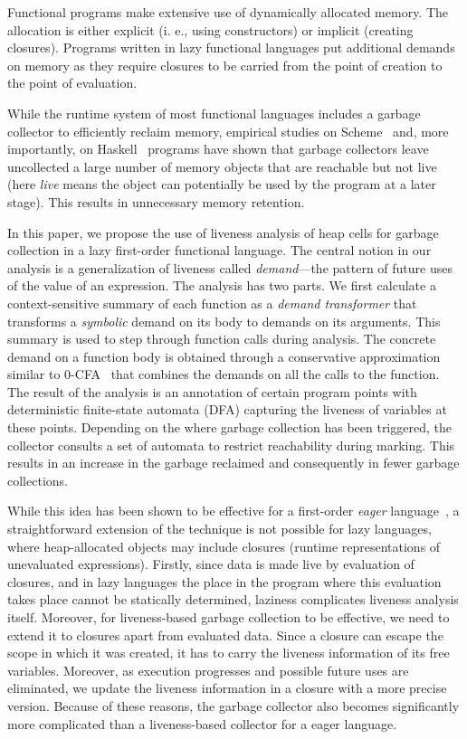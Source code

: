 \documentclass[preprint, 9pt]{sigplanconf}
\begin{document}
Functional programs make extensive use of dynamically allocated
memory.  The
allocation  is either  explicit (i. e., using  constructors) or
implicit (creating  closures).  Programs  written in  lazy
functional languages put additional  demands on memory as they require
closures to  be carried  from the  point of creation  to the  point of
evaluation.

While  the runtime  system  of most  functional  languages includes  a
garbage collector to efficiently  reclaim memory, empirical studies on
Scheme~\cite{karkare06effectiveness}   and,   more   importantly,   on
Haskell~\cite{rojemo96lag} programs have shown that garbage collectors
leave uncollected a large number  of memory objects that are reachable
but not live (here {\em live} means the object can potentially be used
by the program at a  later stage).  This results in unnecessary memory
retention.

In this paper,  we propose the use of liveness  analysis of heap cells
for garbage collection in a lazy first-order functional language.  The
central notion in our analysis  is a generalization of liveness called
{\em  demand}---the  pattern  of  future  uses  of  the  value  of  an
expression.   The  analysis  has  two parts.   We  first  calculate  a
context-sensitive  summary   of  each   function  as  a   {\em  demand
  transformer} that transforms a {\em  symbolic} demand on its body to
demands  on its  arguments.   This  summary is  used  to step  through
function  calls  during analysis.   The  concrete demand  on  a
function body is obtained through a conservative approximation similar
to  0-CFA~\cite{Shivers:1988} that  combines  the demands  on all  the
calls to the function.  The result of the analysis is an annotation of
certain program points with  deterministic finite-state automata (DFA)
capturing the liveness of variables at these points.  Depending on the
where  garbage collection  has been  triggered, the
collector
consults a  set of automata  to restrict reachability  during marking.
This results in an increase  in the garbage reclaimed and consequently
in fewer garbage collections.

While this idea has been shown  to be effective for a first-order {\em
  eager}  language~\cite{asati14lgc}, a  straightforward extension  of
the technique is not possible for lazy languages, where heap-allocated
objects may  include closures (runtime representations  of unevaluated
expressions).   Firstly, since  data  is made  live  by evaluation  of
closures, and  in lazy languages the  place in the program  where this
evaluation  takes  place  cannot be  statically  determined,  laziness
complicates  liveness analysis  itself.  Moreover,  for liveness-based
garbage collection to  be effective, we need to extend  it to closures
apart from  evaluated data.  Since a  closure can escape the  scope in
which it was created, it has  to carry the liveness information of its
free variables. Moreover, as  execution progresses and possible future
uses are eliminated,  we update the liveness information  in a closure
with a  more precise version.  Because of these reasons,   the garbage
collector  also   becomes  significantly   more  complicated   than  a
liveness-based collector for a eager language.
\end{document}
